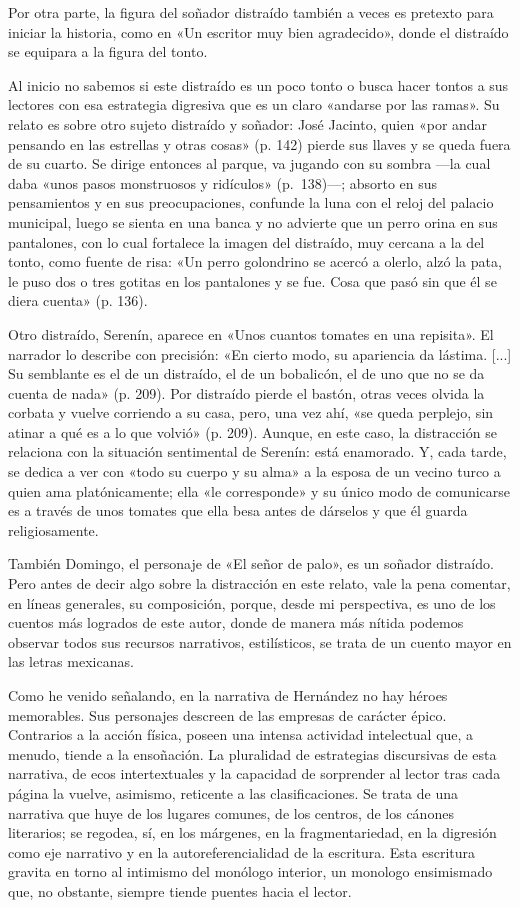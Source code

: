 \documentclass[14pt,twoside,final]{extbook} %
\begin{document}
Por otra parte, la figura del soñador distraído también a veces es pretexto para iniciar la historia, como en «Un escritor muy bien agradecido», donde el distraído se equipara a la figura del tonto.

Al inicio no sabemos si este distraído es un poco tonto o busca hacer tontos a sus lectores con esa estrategia digresiva que es un claro «andarse por las ramas». Su relato es sobre otro sujeto distraído y soñador: José Jacinto, quien «por andar pensando en las estrellas y otras cosas» (p. 142) pierde sus llaves y se queda fuera de su cuarto. Se dirige entonces al parque, va jugando con su sombra ---la cual daba «unos pasos monstruosos y ridículos» (p.~138)---; absorto en sus pensamientos y en sus preocupaciones, confunde la luna con el reloj del palacio municipal, luego se sienta en una banca y no advierte que un perro orina en sus pantalones, con lo cual fortalece la imagen del distraído, muy cercana a la del tonto, como fuente de risa: «Un perro golondrino se acercó a olerlo, alzó la pata, le puso dos o tres gotitas en los pantalones y se fue. Cosa que pasó sin que él se diera cuenta» (p. 136).

Otro distraído, Serenín, aparece en «Unos cuantos tomates en una repisita». El narrador lo describe con precisión: «En cierto modo, su apariencia da lástima. [...] Su semblante es el de un distraído, el de un bobalicón, el de uno que no se da cuenta de nada» (p. 209). Por distraído pierde el bastón, otras veces olvida la corbata y vuelve corriendo a su casa, pero, una vez ahí, «se queda perplejo, sin atinar a qué es a lo que volvió» (p. 209). Aunque, en este caso, la distracción se relaciona con la situación sentimental de Serenín: está enamorado. Y, cada tarde, se dedica a ver con «todo su cuerpo y su alma» a la esposa de un vecino turco a quien ama platónicamente; ella «le corresponde» y su único modo de comunicarse es a través de unos tomates que ella besa antes de dárselos y que él guarda religiosamente.

También Domingo, el personaje de «El señor de palo», es un soñador distraído. Pero antes de decir algo sobre la distracción en este relato, vale la pena comentar, en líneas generales, su composición, porque, desde mi perspectiva, es uno de los cuentos más logrados de este autor, donde de manera más nítida podemos observar todos sus recursos narrativos, estilísticos, se trata de un cuento mayor en las letras mexicanas.

Como he venido señalando, en la narrativa de Hernández no hay héroes memorables. Sus personajes descreen de las empresas de carácter épico. Contrarios a la acción física, poseen una intensa actividad intelectual que, a menudo, tiende a la ensoñación. La pluralidad de estrategias discursivas de esta narrativa, de ecos intertextuales y la capacidad de sorprender al lector tras cada página la
vuelve, asimismo, reticente a las clasificaciones. Se trata de una narrativa que huye de los lugares comunes, de los centros, de los cánones literarios; se regodea, sí, en los márgenes, en la fragmentariedad, en la digresión como eje narrativo y en la autoreferencialidad de la escritura. Esta escritura gravita en torno al intimismo del monólogo interior, un monologo ensimismado que, no obstante, siempre tiende puentes hacia el lector.
\end{document}
